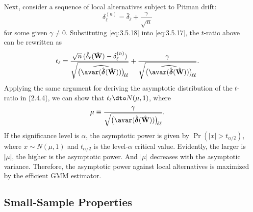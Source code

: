 Next, consider a sequence of local alternatives subject to Pitman drift:
\begin{equation}
  \delta_\ell^{(n)} = \bar{\delta}_\ell + \frac{\gamma}{\sqrt{n}}
  \label{eq:3.5.18}
\end{equation}
for some given $\gamma \neq 0$.  Substituting \eqref{eq:3.5.18} into \eqref{eq:3.5.17}, the
$t$-ratio above can be rewritten as
\begin{equation}
  t_\ell = \frac{\sqrt{n}\,(\hat{\delta}_\ell(\hat{\mathbf{W}})
    - \delta_\ell^{(n)})}
    {\sqrt{\bigl(\widehat{\avar(\hat{\boldsymbol{\delta}}(\hat{\mathbf{W}}))}\bigr)_{\!\ell\ell}}}
  + \frac{\gamma}
    {\sqrt{\bigl(\widehat{\avar(\hat{\boldsymbol{\delta}}(\hat{\mathbf{W}}))}\bigr)_{\!\ell\ell}}}.
  \label{eq:3.5.19}
\end{equation}
Applying the same argument for deriving the asymptotic distribution of the $t$-ratio
in (2.4.4), we can show that $t_\ell \dto N(\mu, 1)$, where
\begin{equation}
  \mu \equiv \frac{\gamma}
    {\sqrt{\bigl(\avar(\hat{\boldsymbol{\delta}}(\hat{\mathbf{W}}))\bigr)_{\!\ell\ell}}}.
  \label{eq:3.5.20}
\end{equation}
If the significance level is $\alpha$, the asymptotic power is given by
$\Pr(|x| > t_{\alpha/2})$, where $x \sim N(\mu, 1)$ and $t_{\alpha/2}$ is the level-$\alpha$ critical
value.  Evidently, the larger is $|\mu|$, the higher is the asymptotic power.  And $|\mu|$
decreases with the asymptotic variance.  Therefore, the asymptotic power against local
alternatives is maximized by the efficient GMM estimator.

\subsection*{Small-Sample Properties}

